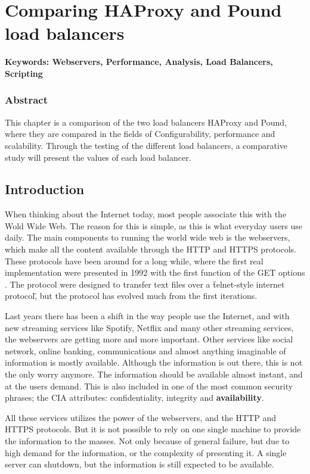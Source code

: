 \chapter{Comparing HAProxy and Pound load balancers}
\textbf{Keywords: Webservers, Performance, Analysis, Load Balancers, Scripting}

\subsection*{Abstract}
This chapter is a comparison of the two load balancers HAProxy and Pound, where
they are compared in the fields of Configurability, performance and
scalability. Through the testing of the different load balancers, a comparative
study will present the values of each load balancer.

\section{Introduction}
When thinking about the Internet today, most people associate this with the
Wold Wide Web. The reason for this is simple, as this is what everyday users use
daily. The main components to running the world wide web is the webservers,
which make all the content available through the HTTP and HTTPS protocols. 
These protocols have been around for a long while, where the first real
implementation were presented in 1992 with the first function of the GET
options \cite{w3:history}. The protocol were designed to transfer text files
over a \"telnet-style internet protocol\", but the protocol has evolved much
from the first iterations. \par

Last years there has been a shift in the way people use the Internet,
and with new streaming services like Spotify, Netflix and many other streaming
services, the webservers are getting more and more important. Other services
like social network, online banking, communications and almost anything
imaginable of information is mostly available. Although the information is out
there, this is not the only worry anymore. The information should be available
almost instant, and at the users demand. This is also included in one of the
most common security phrases; the CIA attributes: confidentiality,
integrity and \textbf{availability}.

All these services utilizes the power of the webservers, and the HTTP and HTTPS
protocols. But it is not possible to rely on one single machine to provide the
information to the masses. Not only because of general failure, but due to high
demand for the information, or the complexity of presenting it. A single server
can shutdown, but the information is still expected to be available.

